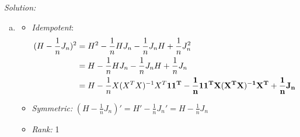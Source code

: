 \documentclass{article}
\newenvironment{solution}
    {\textit{Solution:}}
    {}
\begin{document}
\begin{solution}
\begin{enumerate}[(a)]
\item \begin{itemize} 
\item \emph{Idempotent}: 
\begin{align*}
(H - \frac{1}{n} J_n)^2 &= H^2 - \frac{1}{n} H J_n - \frac{1}{n} J_n H + \frac{1}{n} J_n^2\\
&= H - \frac{1}{n} H J_n - \frac{1}{n} J_n H + \frac{1}{n} J_n\\
&= H - \frac{1}{n} X (X^T X)^{-1} X^T \bf{1} \bf{1}^T - \frac{1}{n} \bf{1} \bf{1}^T  X (X^T X)^{-1} X^T + \frac{1}{n} J_n
\end{align*}
\item \emph{Symmetric:} $(H - \frac{1}{n} J_n)' = H' -\frac{1}{n} J_n' = H - \frac{1}{n} J_n $
\item \emph{Rank:} 1 
\end{itemize}
\end{enumerate}
\end{solution}
\end{document}
